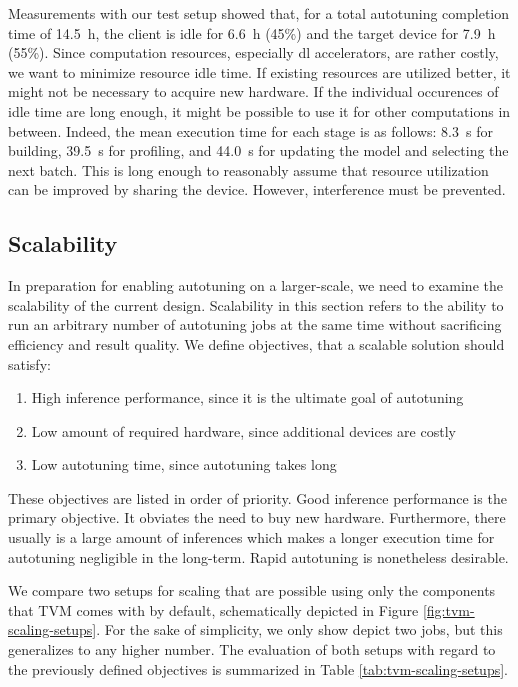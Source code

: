 Measurements with our test setup showed that, for a total autotuning completion time of \SI{14.5}{\hour}, the client is idle for \SI{6.6}{\hour} (45\%) and the target device for \SI{7.9}{\hour} (55\%). Since computation resources, especially \gls{dl} accelerators, are rather costly, we want to minimize resource idle time. If existing resources are utilized better, it might not be necessary to acquire new hardware. If the individual occurences of idle time are long enough, it might be possible to use it for other computations in between. Indeed, the mean execution time for each stage is as follows: \SI{8.3}{\second} for building, \SI{39.5}{\second} for profiling, and \SI{44.0}{\second} for updating the model and selecting the next batch. This is long enough to reasonably assume that resource utilization can be improved by sharing the device. However, interference must be prevented.

\subsection{Scalability}\label{sec:scalability}
In preparation for enabling autotuning on a larger-scale, we need to examine the scalability of the current design. Scalability in this section refers to the ability to run an arbitrary number of autotuning jobs at the same time without sacrificing efficiency and result quality. We define objectives, that a scalable solution should satisfy:
\begin{enumerate}
	\item High inference performance, since it is the ultimate goal of autotuning
	\item Low amount of required hardware, since additional devices are costly
	\item Low autotuning time, since autotuning takes long
\end{enumerate}
These objectives are listed in order of priority. Good inference performance is the primary objective. It obviates the need to buy new hardware. Furthermore, there usually is a large amount of inferences which makes a longer execution time for autotuning negligible in the long-term. Rapid autotuning is nonetheless desirable.

We compare two setups for scaling that are possible using only the components that TVM comes with by default, schematically depicted in Figure \ref{fig:tvm-scaling-setups}. For the sake of simplicity, we only show depict two jobs, but this generalizes to any higher number. The evaluation of both setups with regard to the previously defined objectives is summarized in Table \ref{tab:tvm-scaling-setups}.

